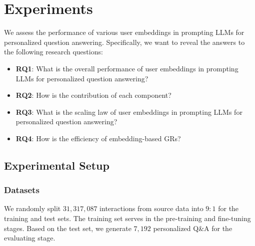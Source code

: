 \section{Experiments}

We assess the performance of various user embeddings in prompting LLMs for personalized question answering. Specifically, we want to reveal the answers to the following research questions:
\begin{itemize}[leftmargin=*]
\item \textbf{RQ1}: What is the overall performance of user embeddings in prompting LLMs for personalized question answering?
\item \textbf{RQ2}: How is the contribution of each component?
\item \textbf{RQ3}: What is the scaling law of user embeddings in prompting LLMs for personalized question answering?
\item \textbf{RQ4}: How is the efficiency of embedding-based GRs?
\end{itemize}

\subsection{Experimental Setup}
\subsubsection{\textbf{Datasets}}
We randomly split $31,317,087$ interactions from source data into $9:1$ for the training and test sets. The training set serves in the pre-training and fine-tuning stages. Based on the test set, we generate $7,192$ personalized Q\&A  for the evaluating stage.
